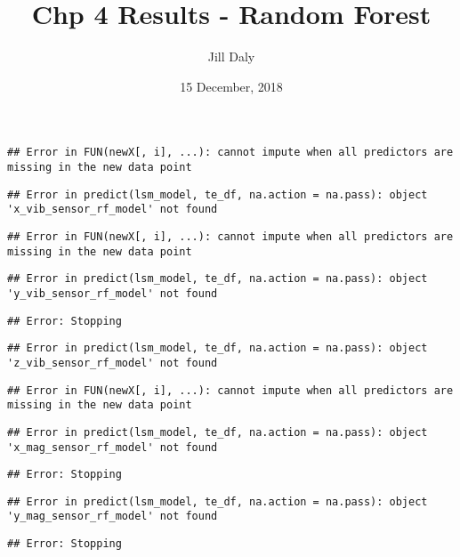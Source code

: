 \documentclass[]{article}
\title{Chp 4 Results - Random Forest}
\author{Jill Daly}
\date{15 December, 2018}
\begin{document}
\maketitle

\begin{verbatim}
## Error in FUN(newX[, i], ...): cannot impute when all predictors are missing in the new data point
\end{verbatim}

\begin{verbatim}
## Error in predict(lsm_model, te_df, na.action = na.pass): object 'x_vib_sensor_rf_model' not found
\end{verbatim}

\begin{verbatim}
## Error in FUN(newX[, i], ...): cannot impute when all predictors are missing in the new data point
\end{verbatim}

\begin{verbatim}
## Error in predict(lsm_model, te_df, na.action = na.pass): object 'y_vib_sensor_rf_model' not found
\end{verbatim}

\begin{verbatim}
## Error: Stopping
\end{verbatim}

\begin{verbatim}
## Error in predict(lsm_model, te_df, na.action = na.pass): object 'z_vib_sensor_rf_model' not found
\end{verbatim}

\begin{verbatim}
## Error in FUN(newX[, i], ...): cannot impute when all predictors are missing in the new data point
\end{verbatim}

\begin{verbatim}
## Error in predict(lsm_model, te_df, na.action = na.pass): object 'x_mag_sensor_rf_model' not found
\end{verbatim}

\begin{verbatim}
## Error: Stopping
\end{verbatim}

\begin{verbatim}
## Error in predict(lsm_model, te_df, na.action = na.pass): object 'y_mag_sensor_rf_model' not found
\end{verbatim}

\begin{verbatim}
## Error: Stopping
\end{verbatim}
\end{document}
